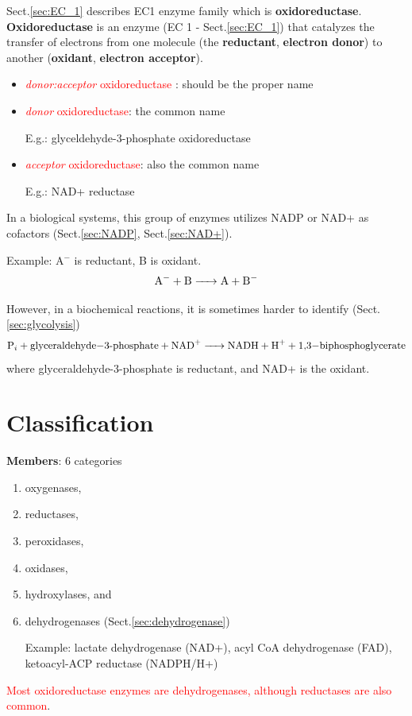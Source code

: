 Sect.\ref{sec:EC_1} describes EC1 enzyme family which is {\bf oxidoreductase}.
{\bf Oxidoreductase} is an enzyme (EC 1 - Sect.\ref{sec:EC_1}) that catalyzes
the transfer of electrons from one molecule (the {\bf reductant}, {\bf electron
donor}) to another ({\bf oxidant}, {\bf electron acceptor}).
\begin{itemize}
  \item \textcolor{red}{{\it donor:acceptor} oxidoreductase } : should be the
  proper name
  
  \item \textcolor{red}{{\it donor} oxidoreductase}: the common name
  
E.g.: glyceldehyde-3-phosphate oxidoreductase

  \item \textcolor{red}{{\it acceptor} oxidoreductase}: also the common name

E.g.: NAD+ reductase
\end{itemize}
In a biological systems, this group of enzymes utilizes NADP or NAD+ as
cofactors (Sect.\ref{sec:NADP}, Sect.\ref{sec:NAD+}).

Example: A$^{-}$ is reductant, B is oxidant.
\begin{equation}
\ce{A^- + B -> A + B-}
\end{equation}

However, in a biochemical reactions, it is sometimes harder to identify
(Sect.\ref{sec:glycolysis})
\begin{equation}
\ce{P_i + glyceraldehyde-3-phosphate + NAD^+ -> NADH + H^+ +
1,3-biphosphoglycerate}
\end{equation}
where glyceraldehyde-3-phosphate is reductant, and NAD+ is the oxidant.

\section{Classification}

{\bf Members}: 6 categories
\begin{enumerate}
  \item  oxygenases, 
  
  \item reductases, 
  
  \item peroxidases, 
  
  \item oxidases, 
  
  \item hydroxylases, and
  
  \item dehydrogenases  (Sect.\ref{sec:dehydrogenase})
  
Example: lactate dehydrogenase (NAD+), acyl CoA dehydrogenase (FAD),
ketoacyl-ACP reductase (NADPH/H+)
\end{enumerate}
\textcolor{red}{Most oxidoreductase enzymes are dehydrogenases, although
reductases are also common}.

